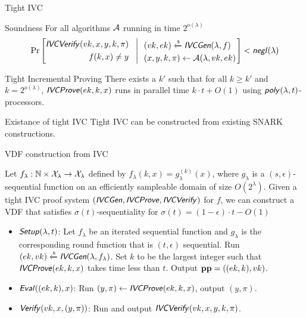 \documentclass[UTF8]{beamer}
\begin{document}
	\begin{frame}{Tight IVC}
		\begin{block}{Soundness}
			For all algorithms $\mathcal{A}$ running in time $2^{o(\lambda)}$
			\begin{equation*}
				\Pr\left[
				\begin{aligned}
					\textsf{\textit{IVCVerify}}(vk,x,y,k,\pi)\\
					f(k,x)\neq y
				\end{aligned}
				~~\left|~~
				\begin{aligned}
					&(vk,ek)\xleftarrow{\text{\tiny$\mathsf{\$}$}}\textsf{\textit{IVCGen}}(\lambda,f)\\
					&(x,y,k,\pi)\gets\mathcal{A}(\lambda,vk,ek)
				\end{aligned}
				\right.\right]<\textsf{\textit{negl}}(\lambda)
			\end{equation*}
		\end{block}
		\begin{block}{Tight Incremental Proving}
			There exists a $k'$ such that for all $k\geq k'$ and $k=2^{o(\lambda)}$, $\textsf{\textit{IVCProve}}(ek,k,x)$ runs in parallel time $k\cdot t+O(1)$ using $\textsf{\textit{poly}}(\lambda,t)$-processors.
		\end{block}
		\begin{block}{Existance of tight IVC}
			Tight IVC can be constructed from existing SNARK constructions.
		\end{block}
	\end{frame}
	\begin{frame}{VDF construction from IVC}
		\begin{block}{}
			Let $f_\lambda:\mathbb{N}\times\mathcal{X}_\lambda\to\mathcal{X}_\lambda$ defined by $f_\lambda(k,x)=g_\lambda^{(k)}(x)$, where $g_\lambda$ is a $(s,\epsilon)$-sequential function on an efficiently sampleable domain of size $O(2^\lambda)$. Given a tight IVC proof system $(\textsf{\textit{IVCGen}},\textsf{\textit{IVCProve}},\textsf{\textit{IVCVerify}})$ for $f$, we can construct a VDF that satisfies $\sigma(t)$-sequentiality for $\sigma(t)=(1-\epsilon)\cdot t-O(1)$
		\end{block}
		\begin{block}{}
			\begin{itemize}
				\item $\textsf{\textit{Setup}}(\lambda,t)$: Let $f_\lambda$ be an iterated sequential function and $g_\lambda$ is the corresponding round function that is $(t,\epsilon)$ sequential. Run $(ek,vk)\xleftarrow{\text{\tiny$\mathsf{\$}$}}\textsf{\textit{IVCGen}}(\lambda,f_\lambda)$. Set $k$ to be the largest integer such that $\textsf{\textit{IVCProve}}(ek,k,x)$ takes time less than $t$. Output $\mathbf{pp}=((ek,k),vk)$.
				\item $\textsf{\textit{Eval}}((ek,k),x)$: Run $(y,\pi)\gets\textsf{\textit{IVCProve}}(ek,k,x)$, output $(y,\pi)$.
				\item $\textsf{\textit{Verify}}(vk,x,(y,\pi))$: Run and output $\textsf{\textit{IVCVerify}}(vk,x,y,k,\pi)$.
			\end{itemize}
		\end{block}
	\end{frame}
\end{document}
